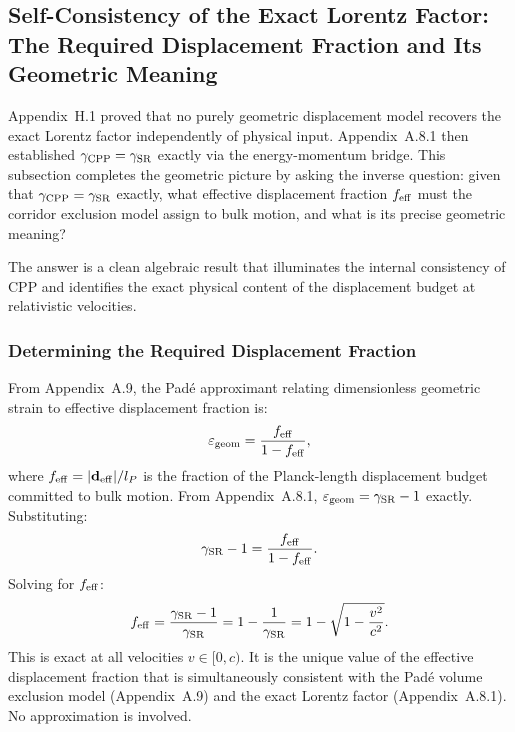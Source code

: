 \documentclass[11pt,letterpaper]{article}
\begin{document}
\subsection{Self-Consistency of the Exact Lorentz Factor: 
The Required Displacement Fraction and Its Geometric Meaning}
\label{app:H2}

Appendix~H.1 proved that no purely geometric displacement model recovers the exact Lorentz factor independently of physical input. 
Appendix~A.8.1 then established $\gamma_{\rm CPP} = \gamma_{\rm SR}$ exactly via the energy-momentum bridge. This subsection completes the geometric picture by asking the inverse question: given that $\gamma_{\rm CPP} = \gamma_{\rm SR}$ exactly, what effective displacement fraction $f_{\rm eff}$ must the corridor exclusion model assign to bulk motion, and what is its precise geometric meaning?

The answer is a clean algebraic result that illuminates the internal consistency of CPP and identifies the exact physical content of the displacement budget at relativistic velocities.

\subsubsection{Determining the Required Displacement Fraction}

From Appendix~A.9, the Padé approximant relating dimensionless 
geometric strain to effective displacement fraction is:
\begin{equation}
\varepsilon_{\rm geom} = \frac{f_{\rm eff}}{1 - f_{\rm eff}},
\label{eq:pade_H2}
\end{equation}
where $f_{\rm eff} = |\mathbf{d}_{\rm eff}|/l_P$ is the fraction of the Planck-length displacement budget committed to bulk motion. From Appendix~A.8.1, $\varepsilon_{\rm geom} = \gamma_{\rm SR} - 1$ exactly. Substituting:
\begin{equation}
\gamma_{\rm SR} - 1 = \frac{f_{\rm eff}}{1 - f_{\rm eff}}.
\label{eq:strain_from_gamma}
\end{equation}
Solving for $f_{\rm eff}$:
\begin{equation}
f_{\rm eff} = \frac{\gamma_{\rm SR} - 1}{\gamma_{\rm SR}} 
= 1 - \frac{1}{\gamma_{\rm SR}} 
= 1 - \sqrt{1 - \frac{v^2}{c^2}}.
\label{eq:feff_exact}
\end{equation}
This is exact at all velocities $v \in [0,c)$. It is the unique value of the effective displacement fraction that is simultaneously consistent with the Padé volume exclusion model (Appendix~A.9) and the exact Lorentz factor (Appendix~A.8.1). No approximation is involved.
\end{document}
